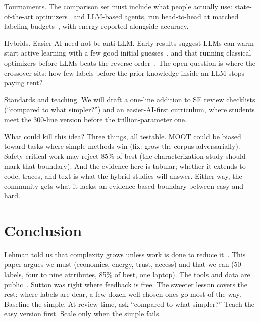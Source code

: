 \documentclass[10pt,conference]{IEEEtran}
\begin{document}
Tournaments. The comparison set must include what people actually
use: state-of-the-art optimizers~\cite{lindauer22, deb02} and
LLM-based agents, run head-to-head at matched labeling
budgets~\cite{ganguly26b}, with energy reported alongside accuracy.

Hybrids. Easier AI need not be anti-LLM. Early results suggest LLMs
can warm-start active learning with a few good initial
guesses~\cite{senthilkumar26}, and that running classical optimizers
before LLMs beats the reverse order~\cite{srinivasan26}. The open
question is where the crossover sits: how few labels before the prior
knowledge inside an LLM stops paying rent?

Standards and teaching. We will draft a one-line addition to SE
review checklists (``compared to what simpler?'') and an
easier-AI-first curriculum, where students meet the 300-line version
before the trillion-parameter one.

What could kill this idea? Three things, all testable.
MOOT could be biased toward tasks where simple methods win
(fix: grow the corpus adversarially). Safety-critical work may
reject 85\% of best (the characterization study should mark that
boundary). And the evidence here is tabular; whether it extends to
code, traces, and text is what the hybrid studies will answer. Either
way, the community gets what it lacks: an evidence-based boundary
between easy and hard.

\section{Conclusion}
Lehman told us that complexity grows unless work is done to reduce
it~\cite{lehman80}. This paper argues we must (economics, energy, trust, access) and
that we can (50 labels, four to nine attributes, 85\% of best, one
laptop). The tools and data are public~\cite{menzies26, moot26}.
Sutton was right where feedback is free. The sweeter lesson covers
the rest: where labels are dear, a few dozen well-chosen ones go
most of the way. Baseline the simple. At review time, ask
``compared to what simpler?'' Teach the easy version first. Scale
only when the simple fails.


\balance


\end{document}
